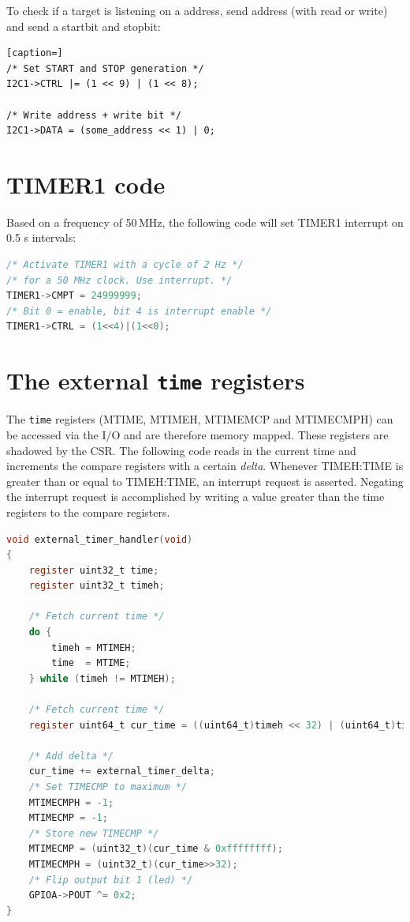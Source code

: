 \documentclass[12pt]{article}
\begin{document}
To check if a target is listening on a address, send address (with read or write) and send a startbit and stopbit:

\begin{lstlisting}[caption=]
/* Set START and STOP generation */
I2C1->CTRL |= (1 << 9) | (1 << 8);

/* Write address + write bit */
I2C1->DATA = (some_address << 1) | 0;
\end{lstlisting} 


\section{TIMER1 code}
Based on a frequency of 50$\,$MHz, the following code will set TIMER1 interrupt on 0.5 s intervals:

\begin{lstlisting}[language=C]
/* Activate TIMER1 with a cycle of 2 Hz */
/* for a 50 MHz clock. Use interrupt. */
TIMER1->CMPT = 24999999;
/* Bit 0 = enable, bit 4 is interrupt enable */
TIMER1->CTRL = (1<<4)|(1<<0);
\end{lstlisting}

\section{The external \texttt{time} registers}
The \lstinline|time| registers (MTIME, MTIMEH, MTIMEMCP and MTIMECMPH) can be accessed via the I/O and are therefore memory mapped. These registers are shadowed by the CSR. The following code reads in the current time and increments the compare registers with a certain \emph{delta}. Whenever TIMEH:TIME is greater than or equal to TIMEH:TIME, an interrupt request is asserted. Negating the interrupt request is accomplished by writing a value greater than the time registers to the compare registers.

\begin{lstlisting}[language=C]
void external_timer_handler(void)
{
    register uint32_t time;
    register uint32_t timeh;

    /* Fetch current time */
    do {
        timeh = MTIMEH;
        time  = MTIME;
    } while (timeh != MTIMEH);

    /* Fetch current time */
    register uint64_t cur_time = ((uint64_t)timeh << 32) | (uint64_t)time;

    /* Add delta */
    cur_time += external_timer_delta;
    /* Set TIMECMP to maximum */
    MTIMECMPH = -1;
    MTIMECMP = -1;
    /* Store new TIMECMP */
    MTIMECMP = (uint32_t)(cur_time & 0xffffffff);
    MTIMECMPH = (uint32_t)(cur_time>>32);
    /* Flip output bit 1 (led) */
    GPIOA->POUT ^= 0x2;
}
\end{lstlisting}
\end{document}
